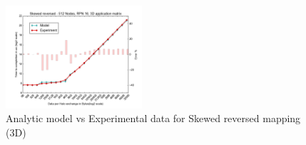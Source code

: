 \documentclass{acm_proc_article-sp}
\begin{document}
\begin{figure}
  \includegraphics[width=0.45\textwidth]{mappings/3d_skewed_reversed.png}
  \caption{Analytic model vs Experimental data for Skewed reversed mapping (3D)}
    \label{fig:3D_skewed_reversed}
\end{figure}



\end{document}
